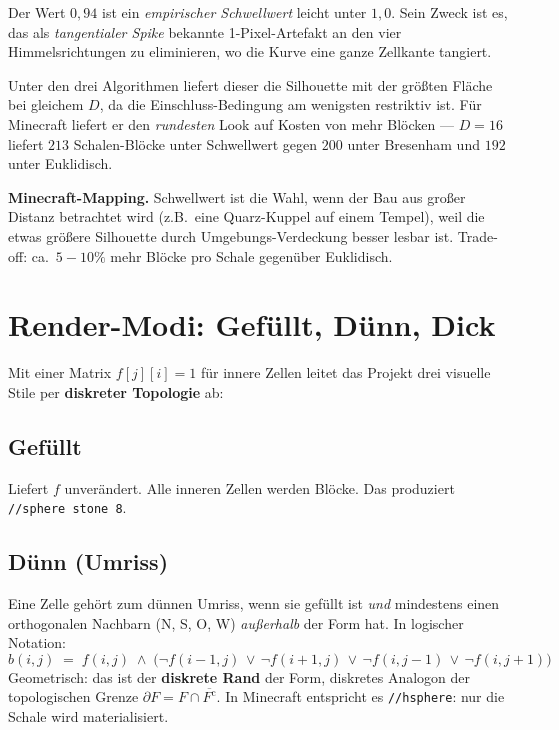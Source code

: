 \documentclass[12pt,a4paper]{scrartcl}
\newcommand{\acc}[1]{\textcolor{accent}{\textbf{#1}}}
\newcommand{\cmd}[1]{\textcolor{earth}{\texttt{\small #1}}}
\begin{document}
Der Wert \acc{$0{,}94$} ist ein \emph{empirischer Schwellwert} leicht unter $1{,}0$. Sein Zweck ist es, das als \emph{tangentialer Spike} bekannte 1-Pixel-Artefakt an den vier Himmelsrichtungen zu eliminieren, wo die Kurve eine ganze Zellkante tangiert.

Unter den drei Algorithmen liefert dieser die Silhouette mit der größten Fläche bei gleichem $D$, da die Einschluss-Bedingung am wenigsten restriktiv ist. Für Minecraft liefert er den \emph{rundesten} Look auf Kosten von mehr Blöcken --- $D=16$ liefert $213$ Schalen-Blöcke unter Schwellwert gegen $200$ unter Bresenham und $192$ unter Euklidisch.

\begin{minec}
\textbf{Minecraft-Mapping.} Schwellwert ist die Wahl, wenn der Bau aus großer Distanz betrachtet wird (z.B.\ eine Quarz-Kuppel auf einem Tempel), weil die etwas größere Silhouette durch Umgebungs-Verdeckung besser lesbar ist. Trade-off: ca.\ $5{-}10\%$ mehr Blöcke pro Schale gegenüber Euklidisch.
\end{minec}

\section{Render-Modi: Gefüllt, Dünn, Dick}

Mit einer Matrix $f[j][i] = 1$ für innere Zellen leitet das Projekt drei visuelle Stile per \acc{diskreter Topologie} ab:

\subsection{Gefüllt}
Liefert $f$ unverändert. Alle inneren Zellen werden Blöcke. Das produziert \cmd{//sphere stone 8}.

\subsection{Dünn (Umriss)}
Eine Zelle gehört zum dünnen Umriss, wenn sie gefüllt ist \emph{und} mindestens einen orthogonalen Nachbarn (N, S, O, W) \emph{außerhalb} der Form hat. In logischer Notation:
\[
b(i,j) \;=\; f(i,j) \;\wedge\;
\bigl(\neg f(i{-}1,j)\,\vee\,\neg f(i{+}1,j)\,\vee\,\neg f(i,j{-}1)\,\vee\,\neg f(i,j{+}1)\bigr)
\]
Geometrisch: das ist der \acc{diskrete Rand} der Form, diskretes Analogon der topologischen Grenze $\partial F = F \cap \overline{F^{\mathrm{c}}}$. In Minecraft entspricht es \cmd{//hsphere}: nur die Schale wird materialisiert.
\end{document}
